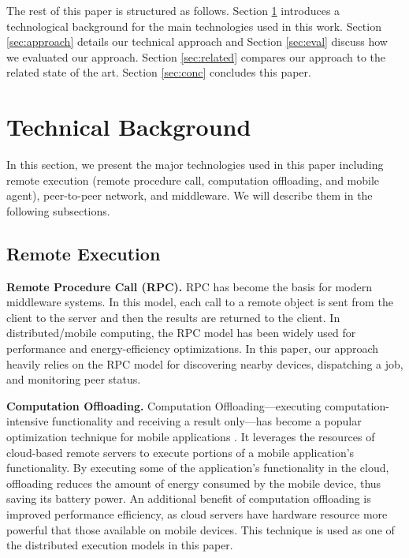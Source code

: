 \documentclass{sig-alternate}
\begin{document}

The rest of this paper is structured as follows. Section \ref{sec:background} introduces a technological background for the main technologies used in this work. Section \ref{sec:approach} details our technical approach and Section \ref{sec:eval} discuss how we evaluated our approach. Section \ref{sec:related} compares our approach to the related state of the art. Section \ref{sec:conc} concludes this paper.
 
\section{Technical Background}
\label{sec:background}
In this section, we present the major technologies used in this paper including remote execution (remote procedure call, computation offloading, and mobile agent), peer-to-peer network, and middleware. We will describe them in the following subsections.

\subsection{Remote Execution}   
\textbf{Remote Procedure Call (RPC).} RPC has become the basis for modern middleware systems. In this model, each call to a remote object is sent from the client to the server and then the results are returned to the client. In distributed/mobile computing, the RPC model has been widely used for performance and energy-efficiency optimizations. In this paper, our approach heavily relies on the RPC model for discovering nearby devices, dispatching a job, and monitoring peer status.

\textbf{Computation Offloading.} Computation Offloading---executing computation-intensive functionality and receiving a result only---has become a popular optimization technique for mobile applications \cite{maui,chun+:eurosys11,kwon+:icsm13,wen2012energy}. It leverages the resources of cloud-based remote servers to execute portions of a mobile application's functionality. By executing some of the application's functionality in the cloud, offloading reduces the amount of energy consumed by the mobile device, thus saving its battery power. An additional benefit of computation offloading is improved performance efficiency, as cloud servers have hardware resource more powerful that those available on mobile devices. This technique is used as one of the distributed execution models in this paper.
\end{document}
